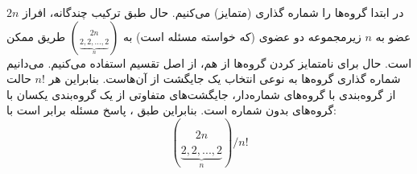 \p
در ابتدا گروه‌ها را شماره گذاری
(متمایز)
می‌کنیم.
حال طبق ترکیب چندگانه، افراز
$2n$
عضو به
$n$
زیرمجموعه دو عضوی (که خواسته مسئله است) به
${2n \choose \underbrace{2,2,...,2}_n}$
طریق ممکن است.
حال برای نامتمایز کردن گروه‌ها از هم، از اصل تقسیم استفاده می‌کنیم.
می‌دانیم شماره گذاری گروه‌ها به نوعی انتخاب یک جایگشت از آن‌هاست.
بنابراین هر
$n!$
حالت از گروه‌بندی با گروه‌های شماره‌دار، جایگشت‌های متفاوتی از
یک گروه‌بندی یکسان با گروه‌های بدون شماره است.
بنابراین طبق 
، پاسخ مسئله برابر است با:
$${2n \choose \underbrace{2,2,...,2}_n}/n!$$
